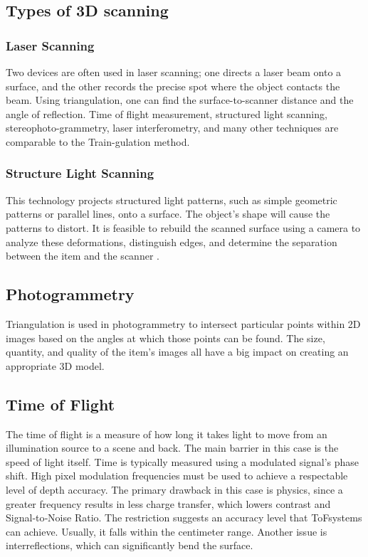\documentclass[12pt]{article}
\begin{document}
\subsection{Types of 3D scanning}

\subsubsection {Laser Scanning}
Two devices are often used in laser scanning; one directs a laser beam onto a surface, and the other records the precise spot where the object contacts the beam. Using triangulation, one can find the surface-to-scanner distance and the angle of reflection.  Time of flight measurement, structured light scanning, stereophoto-grammetry, laser interferometry, and many other techniques are comparable to the Train-gulation method\cite{ref17}.

\subsubsection {Structure Light Scanning}
This technology projects structured light patterns, such as simple geometric patterns or parallel lines, onto a surface.  The object's shape will cause the patterns to distort.  It is feasible to rebuild the scanned surface using a camera to analyze these deformations, distinguish edges, and determine the separation between the item and the scanner \cite{ref17}.

\subsection {Photogrammetry}
Triangulation is used in photogrammetry to intersect particular points within 2D images based on the angles at which those points can be found. The size, quantity, and quality of the item's images all have a big impact on creating an appropriate 3D model\cite{ref17}. 

\subsection{Time of Flight}
The time of flight is a measure of how long it takes light to move from an illumination source to a scene and back. The main barrier in this case is the speed of light itself.  Time is typically measured using a modulated signal's phase shift. High pixel modulation frequencies must be used to achieve a respectable level of depth accuracy. The primary drawback in this case is physics, since a greater frequency results in less charge transfer, which lowers contrast and Signal‑to‑Noise Ratio. The restriction suggests an accuracy level that ToFsystems can achieve. Usually, it falls within the centimeter range. Another issue is interreflections, which can significantly bend the surface\cite{ref15}.
\end{document}
